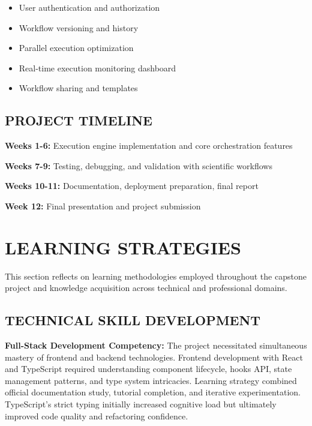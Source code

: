 \documentclass[12pt]{article}
\begin{document}
\begin{itemize}
    \item User authentication and authorization
    \item Workflow versioning and history
    \item Parallel execution optimization
    \item Real-time execution monitoring dashboard
    \item Workflow sharing and templates
\end{itemize}

\subsection{PROJECT TIMELINE}

\hspace{\parindent}\textbf{Weeks 1-6:} Execution engine implementation and core orchestration features

\hspace{\parindent}\textbf{Weeks 7-9:} Testing, debugging, and validation with scientific workflows

\hspace{\parindent}\textbf{Weeks 10-11:} Documentation, deployment preparation, final report

\hspace{\parindent}\textbf{Week 12:} Final presentation and project submission

\newpage
\section{LEARNING STRATEGIES}

\hspace{\parindent}This section reflects on learning methodologies employed throughout the capstone project and knowledge acquisition across technical and professional domains.

\subsection{TECHNICAL SKILL DEVELOPMENT}

\hspace{\parindent}\textbf{Full-Stack Development Competency:} The project necessitated simultaneous mastery of frontend and backend technologies. Frontend development with React and TypeScript required understanding component lifecycle, hooks API, state management patterns, and type system intricacies. Learning strategy combined official documentation study, tutorial completion, and iterative experimentation. TypeScript's strict typing initially increased cognitive load but ultimately improved code quality and refactoring confidence.
\end{document}
